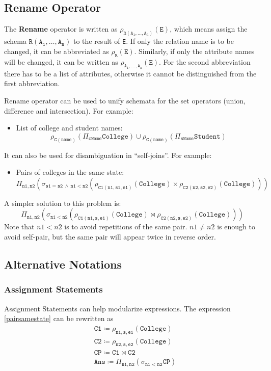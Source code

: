 \subsection{Rename Operator}
The \textbf{Rename} operator is written as $\mathtt{\rho_{R(A_1,\dots,A_n)}(E)}$, which means assign the schema $\mathtt{R(A_1,\dots,A_n)}$ to the result of \texttt{E}. If only the relation name is to be changed, it can be abbreviated as $\mathtt{\rho_R(E)}$. Similarly, if only the attribute names will be changed, it can be written as $\mathtt{\rho_{A_1,\dots,A_n}(E)}$. For the second abbreviation there has to be a list of attributes, otherwise it cannot be distinguished from the first abbreviation.

Rename operator can be used to unify schemata for the set operators (union, difference and intersection). For example:
\begin{itemize}
\item List of college and student names:
\begin{equation*}
\mathtt{\rho_{C(name)}\left(\Pi_{cName}College\right)\cup\rho_{C(name)}\left(\Pi_{sName}Student\right)}
\end{equation*}
\end{itemize}
It can also be used for disambiguation in ``self-joins''. For example:
\begin{itemize}
\item Pairs of colleges in the same state:
\begin{equation*}
\mathtt{\Pi_{n1,n2}\left(\sigma_{s1=s2\:\land\:n1<n2}\left(\rho_{C1(n1,s1,e1)}(College)\times\rho_{C2(n2,s2,e2)}(College)\right)\right)}
\end{equation*}
\end{itemize}
A simpler solution to this problem is:
\begin{equation}\label{pairsamestate}
\mathtt{\Pi_{n1,n2}\left(\sigma_{n1<n2}\left(\rho_{C1(n1,s,e1)}(College)\bowtie\rho_{C2(n2,s,e2)}(College)\right)\right)}
\end{equation} 
Note that $n1<n2$ is to avoid repetitions of the same pair. $n1\neq n2$ is enough to avoid self-pair, but the same pair will appear twice in reverse order.
\subsection{Alternative Notations}
\subsubsection{Assignment Statements}
Assignment Statements can help modularize expressions. The expression \eqref{pairsamestate} can be rewritten as 
\begin{align*}
&\mathtt{C1\coloneqq\rho_{n1,s,e1}(College)}\\
&\mathtt{C2\coloneqq\rho_{n2,s,e2}(College)}\\
&\mathtt{CP\coloneqq C1\bowtie C2}\\
&\mathtt{Ans\coloneqq \Pi_{n1,n2}(\sigma_{n1<n2}CP)}
\end{align*}
